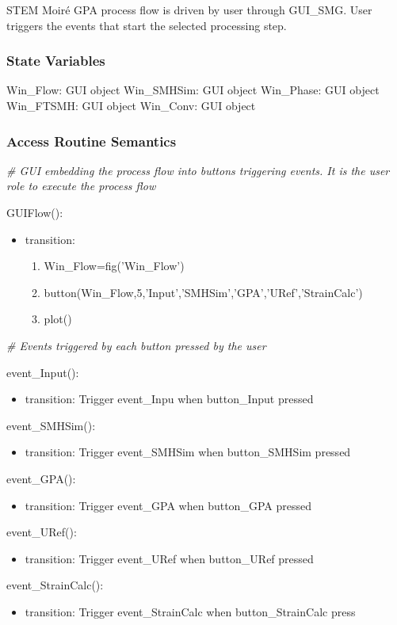 \documentclass[12pt, titlepage]{article}
\newcommand{\progname}{STEM Moir{\'e} GPA}
\begin{document}
\progname{} process flow is driven by user through GUI{\_}SMG. User triggers the events that start the selected processing step. 

\subsubsection{State Variables}

Win{\_}Flow: GUI object
Win{\_}SMHSim: GUI object
Win{\_}Phase: GUI object
Win{\_}FTSMH: GUI object
Win{\_}Conv: GUI object


\subsubsection{Access Routine Semantics}

\noindent\textit{{\#} GUI embedding the process flow into buttons triggering events. It is the user role to execute the process flow}\medskip

\noindent GUIFlow():
\begin{itemize}
\item transition: 
	\begin{enumerate}
	\item Win{\_}Flow=fig('Win{\_}Flow') 
	\item button(Win{\_}Flow,5,'Input','SMHSim','GPA','URef','StrainCalc') 
	\item plot()
	\end{enumerate} 
\end{itemize}
\bigskip

\noindent\textit{{\#} Events triggered by each button pressed by the user}\medskip

\noindent event{\_}Input():
\begin{itemize}
\item transition: Trigger event{\_}Inpu when button{\_}Input pressed
\end{itemize}
\bigskip
\noindent event{\_}SMHSim():
\begin{itemize}
\item transition: Trigger event{\_}SMHSim when button{\_}SMHSim pressed
\end{itemize}
\bigskip
\noindent event{\_}GPA():
\begin{itemize}
\item transition: Trigger event{\_}GPA when button{\_}GPA pressed
\end{itemize}
\bigskip
\noindent event{\_}URef():
\begin{itemize}
\item transition: Trigger event{\_}URef when button{\_}URef pressed
\end{itemize}
\bigskip
\noindent event{\_}StrainCalc():
\begin{itemize}
\item transition: Trigger event{\_}StrainCalc when button{\_}StrainCalc press
\end{itemize}
\bigskip
\end{document}
